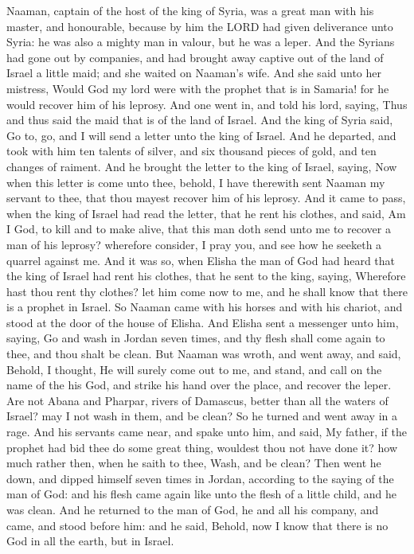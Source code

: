  Naaman, captain of the host of the king of Syria, was a great man with his master, and honourable, because by him the LORD had given deliverance unto Syria: he was also a mighty man in valour, but he was a leper. And the Syrians had gone out by companies, and had brought away captive out of the land of Israel a little maid; and she waited on Naaman's wife. And she said unto her mistress, Would God my lord were with the prophet that is in Samaria! for he would recover him of his leprosy. And one went in, and told his lord, saying, Thus and thus said the maid that is of the land of Israel. And the king of Syria said, Go to, go, and I will send a letter unto the king of Israel. And he departed, and took with him ten talents of silver, and six thousand pieces of gold, and ten changes of raiment. And he brought the letter to the king of Israel, saying, Now when this letter is come unto thee, behold, I have therewith sent Naaman my servant to thee, that thou mayest recover him of his leprosy. And it came to pass, when the king of Israel had read the letter, that he rent his clothes, and said, Am I God, to kill and to make alive, that this man doth send unto me to recover a man of his leprosy? wherefore consider, I pray you, and see how he seeketh a quarrel against me. And it was so, when Elisha the man of God had heard that the king of Israel had rent his clothes, that he sent to the king, saying, Wherefore hast thou rent thy clothes? let him come now to me, and he shall know that there is a prophet in Israel. So Naaman came with his horses and with his chariot, and stood at the door of the house of Elisha. And Elisha sent a messenger unto him, saying, Go and wash in Jordan seven times, and thy flesh shall come again to thee, and thou shalt be clean. But Naaman was wroth, and went away, and said, Behold, I thought, He will surely come out to me, and stand, and call on the name of the  his God, and strike his hand over the place, and recover the leper. Are not Abana and Pharpar, rivers of Damascus, better than all the waters of Israel? may I not wash in them, and be clean? So he turned and went away in a rage. And his servants came near, and spake unto him, and said, My father, if the prophet had bid thee do some great thing, wouldest thou not have done it? how much rather then, when he saith to thee, Wash, and be clean? Then went he down, and dipped himself seven times in Jordan, according to the saying of the man of God: and his flesh came again like unto the flesh of a little child, and he was clean. And he returned to the man of God, he and all his company, and came, and stood before him: and he said, Behold, now I know that there is no God in all the earth, but in Israel.

